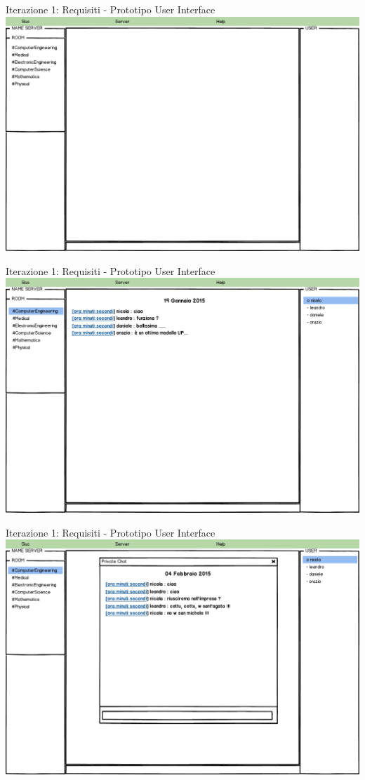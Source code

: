 \begin{frame} {Iterazione 1: Requisiti - Prototipo User Interface}
    \includegraphics[scale=0.28]{image_mockups/06_snuc_connect.png}{\centering}
\end{frame}

\begin{frame} {Iterazione 1: Requisiti - Prototipo User Interface}
    \includegraphics[scale=0.28]{image_mockups/07_snuc_user_room_ce.png}{\centering}
\end{frame}

\begin{frame} {Iterazione 1: Requisiti - Prototipo User Interface}
    \includegraphics[scale=0.28]{image_mockups/08_snuc_user_room_ce_private.png}{\centering}
\end{frame}

